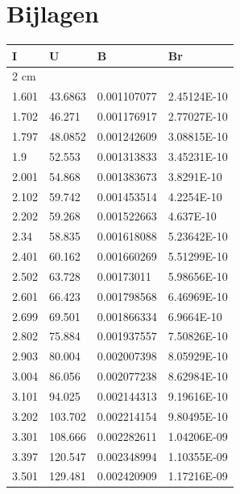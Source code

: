 \documentclass{article}
\begin{document}
\nocite{*}
\printbibliography[title={Referenties}]


\section{Bijlagen}

    \centering
    \begin{longtable}{|l|l|l|l|}
    \hline
        I & U & B & Br \\ \hline
        2 cm & ~ & ~ & ~ \\ \hline
        1.601 & 43.6863 & 0.001107077 & 2.45124E-10 \\ \hline
        1.702 & 46.271 & 0.001176917 & 2.77027E-10 \\ \hline
        1.797 & 48.0852 & 0.001242609 & 3.08815E-10 \\ \hline
        1.9 & 52.553 & 0.001313833 & 3.45231E-10 \\ \hline
        2.001 & 54.868 & 0.001383673 & 3.8291E-10 \\ \hline
        2.102 & 59.742 & 0.001453514 & 4.2254E-10 \\ \hline
        2.202 & 59.268 & 0.001522663 & 4.637E-10 \\ \hline
        2.34 & 58.835 & 0.001618088 & 5.23642E-10 \\ \hline
        2.401 & 60.162 & 0.001660269 & 5.51299E-10 \\ \hline
        2.502 & 63.728 & 0.00173011 & 5.98656E-10 \\ \hline
        2.601 & 66.423 & 0.001798568 & 6.46969E-10 \\ \hline
        2.699 & 69.501 & 0.001866334 & 6.9664E-10 \\ \hline
        2.802 & 75.884 & 0.001937557 & 7.50826E-10 \\ \hline
        2.903 & 80.004 & 0.002007398 & 8.05929E-10 \\ \hline
        3.004 & 86.056 & 0.002077238 & 8.62984E-10 \\ \hline
        3.101 & 94.025 & 0.002144313 & 9.19616E-10 \\ \hline
        3.202 & 103.702 & 0.002214154 & 9.80495E-10 \\ \hline
        3.301 & 108.666 & 0.002282611 & 1.04206E-09 \\ \hline
        3.397 & 120.547 & 0.002348994 & 1.10355E-09 \\ \hline
        3.501 & 129.481 & 0.002420909 & 1.17216E-09 \\ \hline

\end{longtable}
\end{document}
